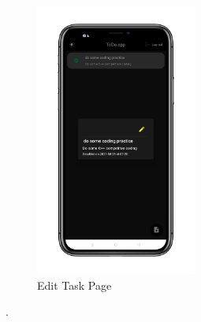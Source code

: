 \begin{figure}[h]
  \begin{center}
   \includegraphics[height=90mm]{Images & Logos/theme/CH_08_Dark_5.png}
  \end{center}
  \caption{Edit Task Page}
\end{figure}  

.


